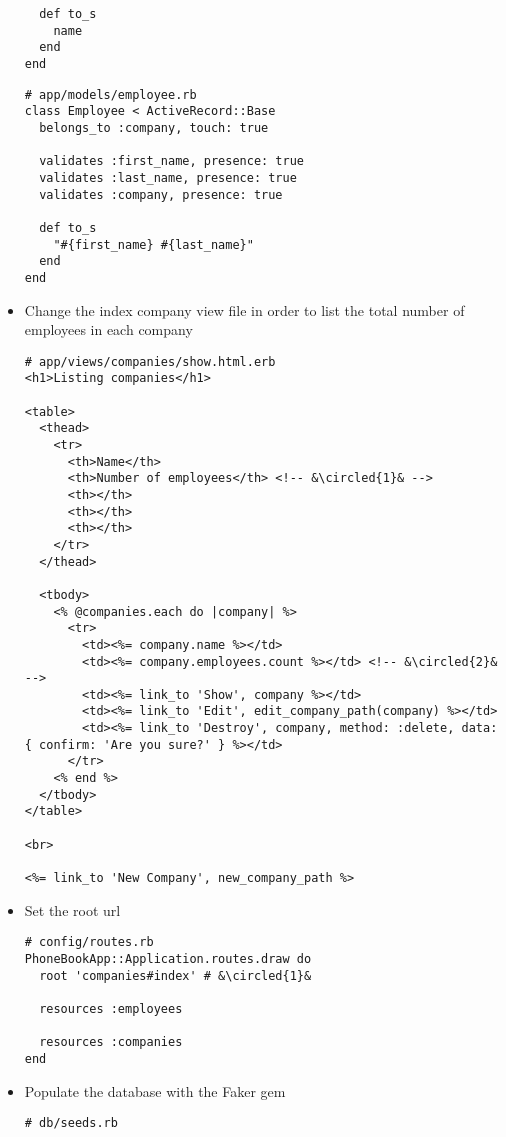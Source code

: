 \documentclass{beamer}
\newcommand*\circled[1]{\tikz[baseline=(char.base)]{
            \node[shape=circle,draw,inner sep=2pt] (char) {#1};}}
\begin{document}
\begin{frame}
\begin{itemize}
\begin{lstlisting}
  def to_s
    name
  end
end
\end{lstlisting}

\lstset{language=Ruby, style=eclipse}
\begin{lstlisting}
# app/models/employee.rb
class Employee < ActiveRecord::Base
  belongs_to :company, touch: true

  validates :first_name, presence: true
  validates :last_name, presence: true
  validates :company, presence: true

  def to_s
    "#{first_name} #{last_name}"
  end
end
\end{lstlisting}
 
\item Change the index company view file in order to list the total number of employees in each company
\lstset{language=Ruby, style=eclipse}
\begin{lstlisting}[escapechar=&]
# app/views/companies/show.html.erb
<h1>Listing companies</h1>

<table>
  <thead>
    <tr>
      <th>Name</th>
      <th>Number of employees</th> <!-- &\circled{1}& -->
      <th></th>
      <th></th>
      <th></th>
    </tr>
  </thead>

  <tbody>
    <% @companies.each do |company| %>
      <tr>
        <td><%= company.name %></td>
        <td><%= company.employees.count %></td> <!-- &\circled{2}& -->
        <td><%= link_to 'Show', company %></td>
        <td><%= link_to 'Edit', edit_company_path(company) %></td>
        <td><%= link_to 'Destroy', company, method: :delete, data: { confirm: 'Are you sure?' } %></td>
      </tr>
    <% end %>
  </tbody>
</table>

<br>

<%= link_to 'New Company', new_company_path %>

\end{lstlisting}

\item Set the root url
\lstset{language=Ruby, style=eclipse}
\begin{lstlisting}[escapechar=&]
# config/routes.rb
PhoneBookApp::Application.routes.draw do
  root 'companies#index' # &\circled{1}&

  resources :employees

  resources :companies
end
\end{lstlisting}

\item Populate the database with the Faker gem
\lstset{language=Ruby, style=eclipse}
\begin{lstlisting}[escapechar=&]
# db/seeds.rb


\end{lstlisting}
\end{itemize}
\end{frame}
\end{document}
